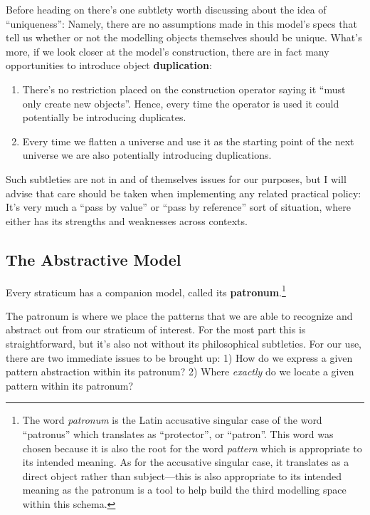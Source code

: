 \documentclass[twoside]{article}
\newcommand{\strong}[1]{{\bfseries #1}}
\begin{document}
Before heading on there's one subtlety worth discussing about the idea of ``uniqueness'': Namely, there are no assumptions
made in this model's specs that tell us whether or not the modelling objects themselves should be unique. What's more,
if we look closer at the model's construction, there are in fact many opportunities to introduce object \strong{duplication}:

\begin{enumerate}
\item There's no restriction placed on the construction operator saying it ``must only create new objects''.
Hence, every time the operator is used it could potentially be introducing duplicates.
\item Every time we flatten a universe and use it as the starting point of the next universe we are also potentially
introducing duplications.
\end{enumerate}

Such subtleties are not in and of themselves issues for our purposes, but I will advise that care should be taken
when implementing any related practical policy: It's very much a ``pass by value'' or ``pass by reference'' sort
of situation, where either has its strengths and weaknesses across contexts.

\subsection*{The Abstractive Model}

Every straticum has a companion model, called its \strong{patronum}.\footnote{The word \emph{patronum} is the Latin
accusative singular case of the word ``patronus'' which translates as ``protector'', or ``patron''. This word was chosen
because it is also the root for the word \emph{pattern} which is appropriate to its intended meaning. As for the accusative
singular case, it translates as a direct object rather than subject---this is also appropriate to its intended meaning
as the patronum is a tool to help build the third modelling space within this schema.}

The patronum is where we place the patterns that we are able to recognize and abstract out from our straticum of interest.
For the most part this is straightforward, but it's also not without its philosophical subtleties. For our use, there are
two immediate issues to be brought up: 1) How do we express a given pattern abstraction within its patronum? 2) Where
\emph{exactly} do we locate a given pattern within its patronum?
\end{document}
